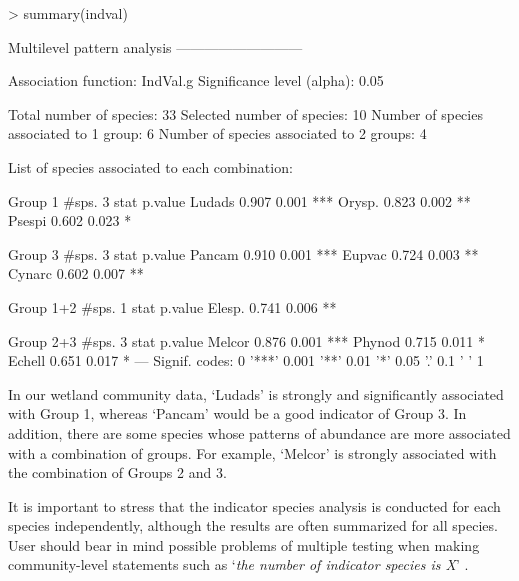 \documentclass[11pt,a4paper]{article}
\begin{document}
\begin{Schunk}
\begin{Sinput}
> summary(indval) 
\end{Sinput}
\begin{Soutput}
 Multilevel pattern analysis
 ---------------------------

 Association function: IndVal.g
 Significance level (alpha): 0.05

 Total number of species: 33
 Selected number of species: 10 
 Number of species associated to 1 group: 6 
 Number of species associated to 2 groups: 4 

 List of species associated to each combination: 

 Group 1  #sps.  3 
        stat p.value    
Ludads 0.907   0.001 ***
Orysp. 0.823   0.002 ** 
Psespi 0.602   0.023 *  

 Group 3  #sps.  3 
        stat p.value    
Pancam 0.910   0.001 ***
Eupvac 0.724   0.003 ** 
Cynarc 0.602   0.007 ** 

 Group 1+2  #sps.  1 
        stat p.value   
Elesp. 0.741   0.006 **

 Group 2+3  #sps.  3 
        stat p.value    
Melcor 0.876   0.001 ***
Phynod 0.715   0.011 *  
Echell 0.651   0.017 *  
---
Signif. codes:  0 '***' 0.001 '**' 0.01 '*' 0.05 '.' 0.1 ' ' 1 
\end{Soutput}
\end{Schunk}
In our wetland community data, `Ludads' is strongly and significantly associated with Group 1, whereas `Pancam' would be a good indicator of Group 3. In addition, there are some species whose patterns of abundance are more associated with a combination of groups. For example, `Melcor' is strongly associated with the combination of Groups 2 and 3.

It is important to stress that the indicator species analysis is conducted for each species independently, although the results are often summarized for all species. User should bear in mind possible problems of multiple testing when making community-level statements such as `\emph{the number of indicator species is X}' \citep{DeCaceres2009}\citep{Legendre2012}.
\end{document}
